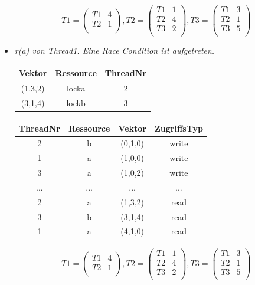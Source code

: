 \documentclass[10pt,a4paper]{article}
\begin{document}
\begin{flushleft}
\begin{itemize}
\[
	T1 = \begin{pmatrix}
		T1 & 4\\
		T2 & 1\\
	\end{pmatrix}
	, T2 = \begin{pmatrix}
		T1 & 1\\		
		T2 & 4\\
		T3 & 2\\
	\end{pmatrix}
	, T3 = \begin{pmatrix}
		T1 & 3\\
		T2 & 1\\		
		T3 & 5\\
	\end{pmatrix}
\]
\item \textit{r(a) von Thread1. Eine Race Condition ist aufgetreten.}\\[0.2cm]
\begin{tabular}{ >{\small}c >{\small}c >{\small}c }
  	Vektor & Ressource & ThreadNr \\\hline
  	(1,3,2) & locka & 2 \\
  	(3,1,4) & lockb & 3 \\\hline
\end{tabular}\hspace*{0.5cm}
\begin{tabular}{ >{\small}c >{\small}c >{\small}c >{\small}c }
  	ThreadNr & Ressource & Vektor & ZugriffsTyp \\\hline
  	2 & b & (0,1,0) & write \\
  	1 & a & (1,0,0) & write \\
  	\color{red}3 & \color{red}a & \color{red}(1,0,2) & \color{red}write \\
  	... & ... & ... & ... \\
  	2 & a & (1,3,2) & read \\
  	3 & b & (3,1,4) & read \\
  	\color{red}1 & \color{red}a & \color{red}(4,1,0) & \color{red}read \\\hline
\end{tabular}
\[
	T1 = \begin{pmatrix}
		T1 & 4\\
		T2 & 1\\
	\end{pmatrix}
	, T2 = \begin{pmatrix}
		T1 & 1\\		
		T2 & 4\\
		T3 & 2\\
	\end{pmatrix}
	, T3 = \begin{pmatrix}
		T1 & 3\\
		T2 & 1\\		
		T3 & 5\\
	\end{pmatrix}
\]
\end{itemize}
\end{flushleft}
\newpage
\end{document}
